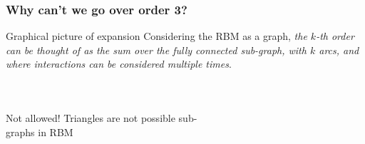 \begin{frame}
  \frametitle{Why can't we go over order 3?}
  \begin{alertblock}{Graphical picture of expansion}
    Considering the RBM as a graph, \emph{the \(k\)-th order can be thought of as the sum over the \alert{fully connected
        sub-graph}, with \emph{\(k\) arcs}, and where interactions can be considered multiple times}.
  \end{alertblock}

  \begin{columns}
      \centering
      \centering
      \centering
      \centering
      \centering
  \end{columns}

  \begin{columns}[T]
    \centering  
    \begin{figure}
      
    \end{figure}
    \centering
    \begin{figure}
      
    \end{figure}
    \centering
    \begin{figure}
      
    \end{figure}
    \centering
    \begin{figure}
      
    \end{figure}
    \centering
    \begin{figure}
      
    \end{figure}
  \end{columns}

  \begin{columns}[T]
    \centering  
    \begin{alertblock}{Not allowed!}
      Triangles are not possible sub-graphs in RBM
    \end{alertblock}
    \centering
    \begin{figure}
      
    \end{figure}
    \centering
    \begin{figure}
      
    \end{figure}
  \end{columns}


\end{frame}
